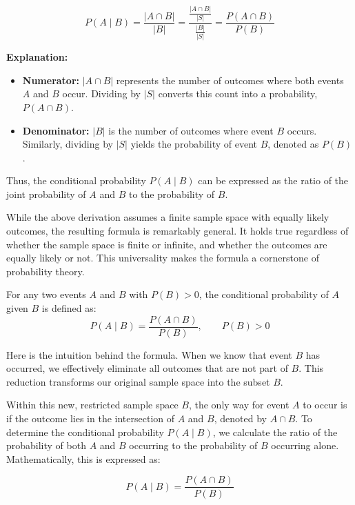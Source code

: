 \[
P(A \mid B) = \frac{|A \cap B|}{|B|} = \frac{\frac{|A \cap B|}{|S|}}{\frac{|B|}{|S|}} = \frac{P(A \cap B)}{P(B)}
\]

\textbf{Explanation:}

\begin{itemize}
    \item \textbf{Numerator:} \( |A \cap B| \) represents the number of outcomes where both events \( A \) and \( B \) occur. Dividing by \( |S| \) converts this count into a probability, \( P(A \cap B) \).
    \item \textbf{Denominator:} \( |B| \) is the number of outcomes where event \( B \) occurs. Similarly, dividing by \( |S| \) yields the probability of event \( B \), denoted as \( P(B) \).
\end{itemize}

Thus, the conditional probability \( P(A \mid B) \) can be expressed as the ratio of the joint probability of \( A \) and \( B \) to the probability of \( B \).

While the above derivation assumes a finite sample space with equally likely outcomes, the resulting formula is remarkably general. It holds true regardless of whether the sample space is finite or infinite, and whether the outcomes are equally likely or not. This universality makes the formula a cornerstone of probability theory.

\begin{definition}
For any two events \( A \) and \( B \) with \( P(B) > 0 \), the conditional probability of \( A \) given \( B \) is defined as:
\[
P(A \mid B) = \frac{P(A \cap B)}{P(B)}, \qquad P(B) > 0
\]
\end{definition}

Here is the intuition behind the formula. When we know that event \( B \) has occurred, we effectively eliminate all outcomes that are not part of \( B \). This reduction transforms our original sample space into the subset \( B \).

Within this new, restricted sample space \( B \), the only way for event \( A \) to occur is if the outcome lies in the intersection of \( A \) and \( B \), denoted by \( A \cap B \). To determine the conditional probability \( P(A \mid B) \), we calculate the ratio of the probability of both \( A \) and \( B \) occurring to the probability of \( B \) occurring alone. Mathematically, this is expressed as:

\[
P(A \mid B) = \frac{P(A \cap B)}{P(B)}
\]

